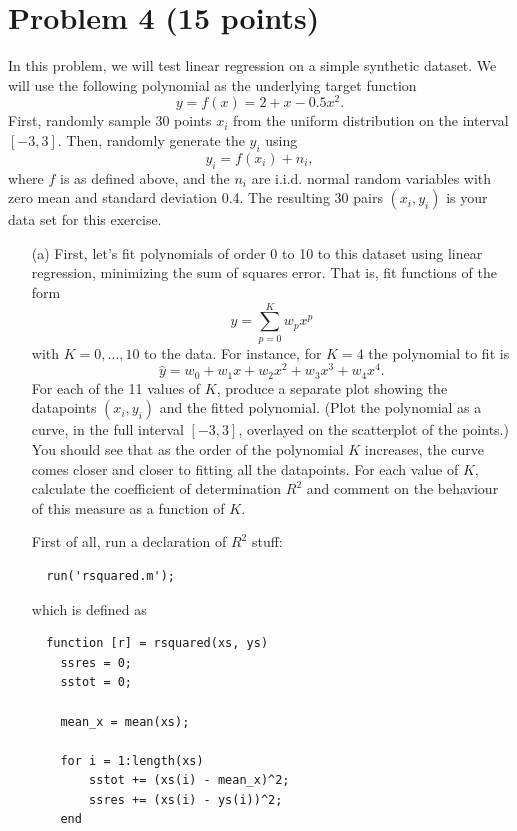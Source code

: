 \documentclass[10pt]{article}
\begin{document}
\section*{Problem 4 (15 points)}
In this problem, we will test linear regression on a simple synthetic dataset. We will use the following polynomial as the underlying target function
\[
y = f(x) = 2 + x - 0.5 x^2.
\]
First, randomly sample 30 points $x_i$ from the uniform distribution on the interval $[-3,3]$. Then, randomly generate the $y_i$ using
\[
y_i = f(x_i) + n_i,
\]
where $f$ is as defined above, and the $n_i$ are i.i.d. normal random variables with zero mean and standard deviation 0.4. The resulting 30 pairs $(x_i, y_i)$ is your data set for this exercise.
\begin{itemize}
  \item[(a)] First, let's fit polynomials of order 0 to 10 to this dataset using linear regression, minimizing the sum of squares error. That is, fit functions of the form
  \[
  \hat{y} = \sum_{p = 0}^K w_px^p
  \]
  with $K = 0, \dots, 10$ to the data. For instance, for $K = 4$ the polynomial to fit is 
  \[
  \hat{y} = w_0 + w_1x + w_2x^2 + w_3x^3 + w_4x^4.
  \]
  For each of the 11 values of $K$, produce a separate plot showing the datapoints $(x_i, y_i)$ and the fitted polynomial. (Plot the polynomial as a curve, in the full interval $[-3, 3]$, overlayed on the scatterplot of the points.) You should see that as the order of the polynomial $K$ increases, the curve comes closer and closer to fitting all the datapoints. For each value of $K$, calculate the coefficient of determination $R^2$ and comment on the behaviour of this measure as a function of $K$.
  
  \color{black}
  First of all, run a declaration of $R^2$ stuff:
  \begin{verbatim}
  run('rsquared.m');
  \end{verbatim}
  which is defined as
  \begin{verbatim}
  function [r] = rsquared(xs, ys)
    ssres = 0;
    sstot = 0;

    mean_x = mean(xs);

    for i = 1:length(xs)
        sstot += (xs(i) - mean_x)^2;
        ssres += (xs(i) - ys(i))^2;
    end


\end{verbatim}
\end{itemize}
\end{document}
